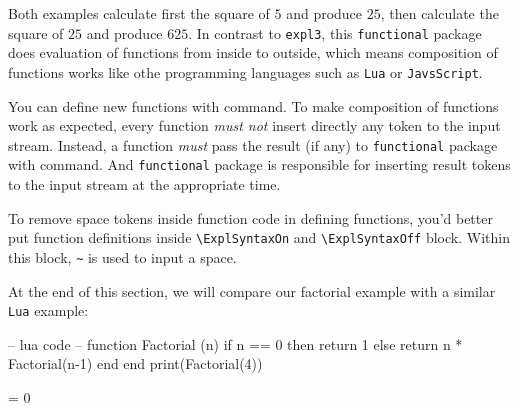 \documentclass[oneside]{book}
\begin{document}
\begin{codehigh}
\ExplSyntaxOn
\PrgNewFunction {} {
  \IntSet {}
  \Result { \Value \lTmpaInt }
}
\ExplSyntaxOff
{}
\end{codehigh}



Both examples calculate first the square of $5$ and produce $25$,
then calculate the square of $25$ and produce $625$.
In contrast to \verb!expl3!, this \verb!functional! package
does evaluation of functions from inside to outside,
which means composition of functions works like othe programming languages
such as \verb!Lua! or \verb!JavsScript!.

You can define new functions with  command.
To make composition of functions work as expected,
every function \emph{must not} insert directly any token to the input stream.
Instead, a function \emph{must} pass the result (if any) to \verb!functional! package
with  command. And \verb!functional! package is responsible for
inserting result tokens to the input stream at the appropriate time.

To remove space tokens inside function code in defining functions,
you'd better put function definitions inside \verb!\ExplSyntaxOn! and
\verb!\ExplSyntaxOff! block. Within this block, \verb!~! is used to input a space.

At the end of this section,
we will compare our factorial example with a similar \verb!Lua! example:

\begin{code}
-- lua code --
function Factorial (n)
  if n == 0 then
    return 1
  else
    return n * Factorial(n-1)
  end
end
print(Factorial(4))
\end{code}

\begin{codehigh}
\ExplSyntaxOn
\PrgNewFunction {} {
   = {0} {
  }{
  }
}
\ExplSyntaxOff
{}
\end{codehigh}
\end{document}
